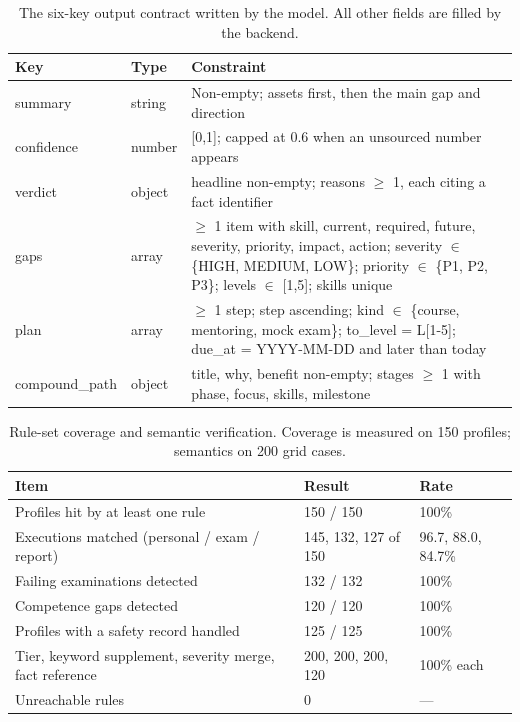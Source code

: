 \documentclass[conference]{IEEEtran}
\begin{document}
\begin{table}[t]
\caption{The six-key output contract written by the model. All other fields are filled by the backend.}
\centering
\footnotesize
\begin{tabular}{@{}p{}p{}p{}@{}}
\hline
\textbf{Key} & \textbf{Type} & \textbf{Constraint} \\ \hline
summary & string & Non-empty; assets first, then the main gap and direction \\
confidence & number & [0,1]; capped at 0.6 when an unsourced number appears \\
verdict & object & headline non-empty; reasons $\ge$ 1, each citing a fact identifier \\
gaps & array & $\ge$ 1 item with skill, current, required, future, severity, priority, impact, action; severity $\in$ \{HIGH, MEDIUM, LOW\}; priority $\in$ \{P1, P2, P3\}; levels $\in$ [1,5]; skills unique \\
plan & array & $\ge$ 1 step; step ascending; kind $\in$ \{course, mentoring, mock exam\}; to\_level = L[1-5]; due\_at = YYYY-MM-DD and later than today \\
compound\_path & object & title, why, benefit non-empty; stages $\ge$ 1 with phase, focus, skills, milestone \\
\hline
\end{tabular}
\end{table}

\begin{table}[t]
\caption{Rule-set coverage and semantic verification. Coverage is measured on 150 profiles; semantics on 200 grid cases.}
\centering
\footnotesize
\begin{tabular}{@{}p{}p{}p{}@{}}
\hline
\textbf{Item} & \textbf{Result} & \textbf{Rate} \\ \hline
Profiles hit by at least one rule & 150 / 150 & 100\% \\
Executions matched (personal / exam / report) & 145, 132, 127 of 150 & 96.7, 88.0, 84.7\% \\
Failing examinations detected & 132 / 132 & 100\% \\
Competence gaps detected & 120 / 120 & 100\% \\
Profiles with a safety record handled & 125 / 125 & 100\% \\
Tier, keyword supplement, severity merge, fact reference & 200, 200, 200, 120 & 100\% each \\
Unreachable rules & 0 & --- \\
\hline
\end{tabular}
\end{table}
\end{document}
